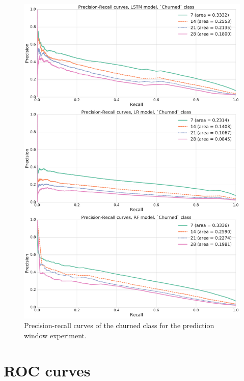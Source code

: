 \documentclass{kththesis}
\begin{document}
\begin{figure}
    \centering
    \includegraphics[width=1.0\textwidth,keepaspectratio]{figures/prc_pred_window.pdf}
    \caption{Precision-recall curves of the churned class for the prediction window experiment.}
    \label{fig:prc_pred_window}
\end{figure}

\clearpage

\section{ROC curves}
\end{document}
